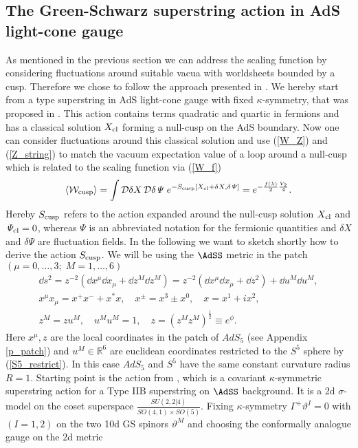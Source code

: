 \subsection{The Green-Schwarz superstring action in AdS light-cone gauge}
As mentioned in the previous section we can address the scaling function by considering fluctuations around suitable vacua with worldsheets bounded by a cusp. Therefore we chose to follow the approach presented in \cite{Giombi:2009gd}. We hereby start from a  type superstring in AdS light-cone gauge with fixed $\kappa$-symmetry, that was proposed in \cite{Metsaev:2000yf,Metsaev:2000yu}. This action contains terms quadratic and quartic in fermions and has a classical solution $X_{\rm cl}$ forming a null-cusp on the AdS boundary. Now one can consider fluctuations around this classical solution and use (\ref{W_Z}) and (\ref{Z_string}) to match the vacuum expectation value of a  loop around a null-cusp which is related to the scaling function via (\ref{W_f})
%
%
\begin{equation}
\langle \mathcal{W}_{\rm cusp} \rangle = \int \mathcal{D}\delta X\, \mathcal{D}\delta \mathit{\Psi}\; e^{-S_{\rm cusp}[X_{\rm cl} + \delta X,\delta \mathit{\Psi}]} = e^{-\frac{f(\lambda)}{2}\frac{V_{2}}{4}}.
\label{eq: W_S_cusp}
\end{equation}
%
%
Hereby $S_{\rm cusp}$ refers to the action expanded around the null-cusp solution $X_{\rm cl}$ and $\mathit{\Psi}_{\rm cl} = 0$, whereas $\mathit{\Psi}$ is an abbreviated notation for the fermionic quantities and $\delta X$ and $\delta\mathit{\Psi}$ are fluctuation fields. In the following we want to sketch shortly how to derive the action $S_{\rm cusp}$. We will be using the $\AdSS$ metric in the  patch $(\mu = 0,\ldots,3; \; M=1,\ldots,6)$
%
%
\begin{gather}
\dd s^{2} = z^{-2}\left( \dd x^{\mu}\dd x_{\mu} + \dd z^{M} \dd z^{M} \right) = z^{-2} \left(\dd x^{\mu}\dd x_{\mu} + \dd z^{2}\right) + \dd u^{M}\dd u^{M}, \\
x^{\mu}x_{\mu} = x^{+}x^{-} + x^{*}x, \quad x^{\pm} = x^{3}\pm x^{0}, \quad  x = x^{1} +ix^{2}, \\
z^{M} = zu^{M}, \quad  u^{M}u^{M} = 1, \quad  z=\left(z^{M}z^{M}\right)^{\frac{1}{2}} \equiv e^{\phi}. \label{S5_restrict}
\end{gather}
%
%
Here $x^{\mu},z$ are the local coordinates in the  patch of $AdS_{5}$ (see Appendix \ref{p_patch}) and $u^{M}\in \mathbb{R}^{6}$ are euclidean coordinates restricted to the $S^{5}$ sphere by (\ref{S5_restrict}). In this case $AdS_{5}$ and $S^{5}$ have the same constant curvature radius $R=1$. Starting point is the action from \cite{Metsaev:1998it}, which is a covariant $\kappa$-symmetric superstring action for a Type IIB superstring on $\AdSS$ background. It is a 2d $\sigma$-model on the coset superspace $\frac{SU(2,2\vert 4)}{SO(4,1)\times SO(5)}$. Fixing $\kappa$-symmetry $\Gamma^{+}\vartheta^{I}=0$ with $(I=1,2)$ on the two 10d  GS spinors $\vartheta^{M}$  and choosing the conformally analogue gauge on the 2d metric
